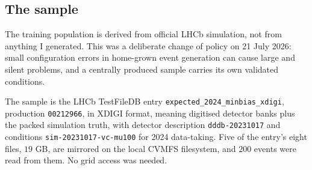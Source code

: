 \documentclass[11pt,a4paper]{article}
\begin{document}
\subsection{The sample}
\label{sec:sample}

The training population is derived from official LHCb simulation, not from
anything I generated. This was a deliberate change of policy on 21 July 2026:
small configuration errors in home-grown event generation can cause large and
silent problems, and a centrally produced sample carries its own validated
conditions.

The sample is the LHCb TestFileDB entry \texttt{expected\_2024\_minbias\_xdigi},
production \texttt{00212966}, in XDIGI format, meaning digitised detector banks
plus the packed simulation truth, with detector description
\texttt{dddb-20231017} and conditions \texttt{sim-20231017-vc-mu100} for 2024
data-taking. Five of the entry's eight files, $19$ GB, are mirrored on the local
CVMFS filesystem, and $200$ events were read from them. No grid access was
needed.
\end{document}
